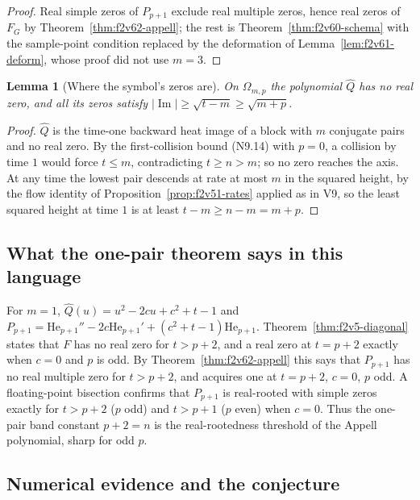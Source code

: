 \documentclass[11pt]{article}
\newtheorem{lemma}[theorem]{Lemma}
\theoremstyle{definition}
\theoremstyle{remark}
\begin{document}
\begin{proof}
Real simple zeros of \(P_{p+1}\) exclude real multiple zeros, hence
real zeros of \(F_G\) by Theorem~\ref{thm:f2v62-appell}; the rest is
Theorem~\ref{thm:f2v60-schema} with the sample-point condition
replaced by the deformation of Lemma~\ref{lem:f2v61-deform}, whose
proof did not use \(m=3\).
\end{proof}

\begin{lemma}[Where the symbol's zeros are]
\label{lem:f2v62-symbol}
On \(\Omega_{m,p}\) the polynomial \(\widehat Q\) has no real zero, and
all its zeros satisfy \(|\operatorname{Im}|\ge\sqrt{t-m}\ge\sqrt{m+p}\).
\end{lemma}

\begin{proof}
\(\widehat Q\) is the time-one backward heat image of a block with
\(m\) conjugate pairs and no real zero.  By the first-collision bound
\textup{(N9.14)} with \(p=0\), a collision by time \(1\) would force
\(t\le m\), contradicting \(t\ge n>m\); so no zero reaches the axis.
At any time the lowest pair descends at rate at most \(m\) in the
squared height, by the flow identity of Proposition~\ref{prop:f2v51-rates}
applied as in V9, so the least squared height at time \(1\) is at least
\(t-m\ge n-m=m+p\).
\end{proof}

\subsection{What the one-pair theorem says in this language}

For \(m=1\), \(\widehat Q(u)=u^2-2cu+c^2+t-1\) and
\(P_{p+1}=\mathrm{He}_{p+1}''-2c\mathrm{He}_{p+1}'+(c^2+t-1)\mathrm{He}_{p+1}\).
Theorem~\ref{thm:f2v5-diagonal} states that \(F\) has no real zero for
\(t>p+2\), and a real zero at \(t=p+2\) exactly when \(c=0\) and \(p\)
is odd.  By Theorem~\ref{thm:f2v62-appell} this says that \(P_{p+1}\)
has no real multiple zero for \(t>p+2\), and acquires one at
\(t=p+2\), \(c=0\), \(p\) odd.  A floating-point bisection confirms
that \(P_{p+1}\) is real-rooted with simple zeros exactly for
\(t>p+2\) (\(p\) odd) and \(t>p+1\) (\(p\) even) when \(c=0\).  Thus
the one-pair band constant \(p+2=n\) is the real-rootedness threshold of
the Appell polynomial, sharp for odd \(p\).

\subsection{Numerical evidence and the conjecture}
\end{document}
